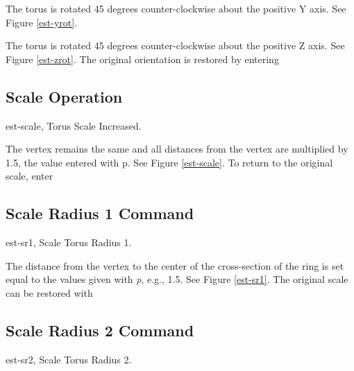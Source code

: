 
The torus is rotated 45 degrees counter-clockwise about the positive Y axis.
See Figure \ref{est-yrot}.


The torus is rotated 45 degrees counter-clockwise about the positive Z axis.
See Figure \ref{est-zrot}.
The original orientation is restored by entering


\subsection{Scale Operation}
\mfig est-scale, Torus Scale Increased.


The vertex remains the same and all distances from the vertex are
multiplied by 1.5, the value entered with p.  See Figure \ref{est-scale}.
To return to the original scale, enter


\subsection{Scale Radius 1 Command}
\mfig est-sr1, Scale Torus Radius 1.


The distance from the vertex to the center of the cross-section of the
ring is set equal to the values given with {\em p}, e.g., 1.5.
See Figure \ref{est-sr1}.
The original scale can be restored with


\subsection{Scale Radius 2 Command}
\mfig est-sr2, Scale Torus Radius 2.

